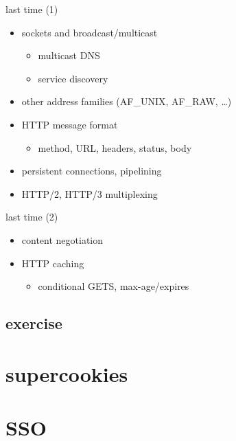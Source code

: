 \date{}
\title{}
\date{}
\usepackage{pgfplots}
\pgfplotsset{compat=1.14}

\begin{frame}
    \titlepage
\end{frame}

\begin{frame}{last time (1)}
    \begin{itemize}
    \item sockets and broadcast/multicast
        \begin{itemize}
        \item multicast DNS
        \item service discovery
        \end{itemize}
    \item other address families (AF\_UNIX, AF\_RAW, \ldots)
    \item HTTP message format
        \begin{itemize}
        \item method, URL, headers, status, body
        \end{itemize}
    \item persistent connections, pipelining
    \item HTTP/2, HTTP/3 multiplexing
    \end{itemize}
\end{frame}

\begin{frame}{last time (2)}
    \begin{itemize}
    \item content negotiation
    \item HTTP caching
        \begin{itemize}
        \item conditional GETS, max-age/expires
        \end{itemize}
    \end{itemize}
\end{frame}


\subsection{exercise}


\section{supercookies}


\section{SSO}


